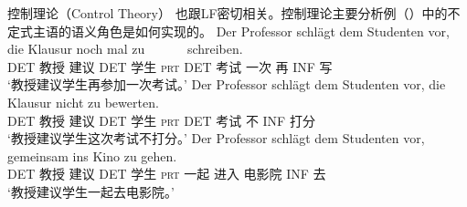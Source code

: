 控制理论（Control Theory） 也跟LF密切相关。控制理论主要分析例（）中的不定式主语的语义角色是如何实现的。
\eal
\ex 
\gll Der Professor schlägt dem Studenten vor, die Klausur noch mal zu~~~~~~ schreiben.\\
	 DET 教授 建议 DET 学生 \textsc{prt} DET 考试 一次 再 INF 写\\
\glt `教授建议学生再参加一次考试。'
\ex 
\gll Der Professor schlägt dem Studenten vor, die Klausur nicht zu bewerten.\\
	 DET 教授 建议 DET 学生 \textsc{prt} DET 考试 不 INF 打分\\
\glt `教授建议学生这次考试不打分。'
\ex 
\gll Der Professor schlägt dem Studenten vor, gemeinsam ins Kino zu gehen.\hspace{-3pt}\\
	 DET 教授 建议 DET 学生 \textsc{prt} 一起 进入 电影院 INF 去\\
\glt `教授建议学生一起去电影院。'
\zl
{}

